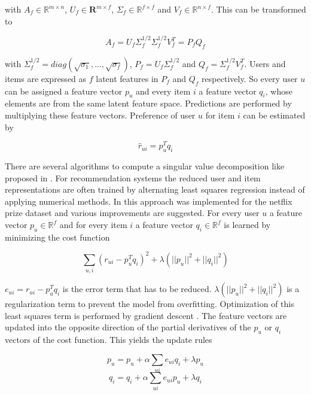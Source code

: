 \documentclass[10pt]{reportMaster}
\begin{document}
with $A_f \in \mathds{R}^{m \times n}$, $U_f \in \mathbf{R}^{m \times f}$, $\Sigma_f \in \mathds{R}^{f \times f}$ and $V_f \in \mathds{R}^{n \times f}$.
This can be transformed to 

\begin{equation}
	A_f = U_f \Sigma_f^{1/2} \Sigma_f^{1/2} V_f^T = P_f Q_f
\end{equation}

with $\Sigma_f^{1/2} = diag(\sqrt{\sigma_1}, ..., \sqrt{\sigma_f})$, $P_f = U_f \Sigma_f^{1/2}$ and $Q_f = \Sigma_f^{1/2} V_f^T$.
Users and items are expressed as $f$ latent features in $P_f$ and $Q_f$ respectively.
So every user $u$ can be assigned a feature vector $p_u$ and every item $i$ a feature vector $q_i$, whose elements are from the same latent feature space.
Predictions are performed by multiplying these feature vectors.
Preference of user $u$ for item $i$ can be estimated by 

\begin{equation}
	\hat{r}_{ui} = p_u^T q_i
\end{equation}


There are several algorithms to compute a singular value decomposition like proposed in \cite{svdGolubSolution}.
For recommendation systems the reduced user and item representations are often trained by alternating least squares regression instead of applying numerical methods.
In \cite{matrixFactorizationDifRegParam} this approach was implemented for the netflix prize dataset and various improvements are suggested.
For every user $u$ a feature vector $p_u \in \mathds{R}^f$ and for every item $i$ a feature vector $q_i \in \mathds{R}^f$ is learned by minimizing the cost function 

\begin{equation}
	\sum_{u, i}{(r_{ui} - p_u^T q_i)^2 + \lambda (||p_u||^2 + ||q_i||^2)}
\end{equation}

$e_{ui} = r_{ui} - p_u^T q_i$ is the error term that has to be reduced.
$\lambda (||p_u||^2 + ||q_i||^2)$ is a regularization term to prevent the model from overfitting.
Optimization of this least squares term is performed by gradient descent \cite{ngRegressionLectureNotes}.
The feature vectors are updated into the opposite direction of the partial derivatives of the $p_u$ or $q_i$ vectors of the cost function.
This yields the update rules

\begin{equation}
	p_u = p_u + \alpha \sum_{ui}{e_{ui} q_i + \lambda p_u}
\end{equation}
\begin{equation}
	q_i = q_i + \alpha \sum_{ui}{e_{ui} p_u + \lambda q_i}
\end{equation}
\end{document}
